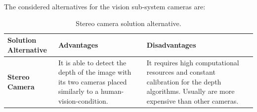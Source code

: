 \documentclass[11pt]{report} %
\begin{document}
The considered alternatives for the vision sub-system cameras are:\\


\begin{table}[H]
\begin{center}
    \begin{tabular}{M{6.6cm}M{3.3cm}M{3.3cm}}
    \hline
    \textbf{Solution Alternative} & \textbf{Advantages} & \textbf{Disadvantages} \\ 
    \hline
    
    \textbf{Stereo Camera}

    
    \citep{cite_stereo_camera_zed}

    &
    
    It is able to detect the depth of the image with its two cameras placed similarly to a human-vision-condition.
    
    &
    
    It requires high computational resources and constant calibration for the depth algorithms. Usually are more expensive than other cameras.
    
    \\ \hline
    \end{tabular}
\caption{\label{tab:stereo} Stereo camera solution alternative.}
\end{center}
\end{table}
\end{document}
